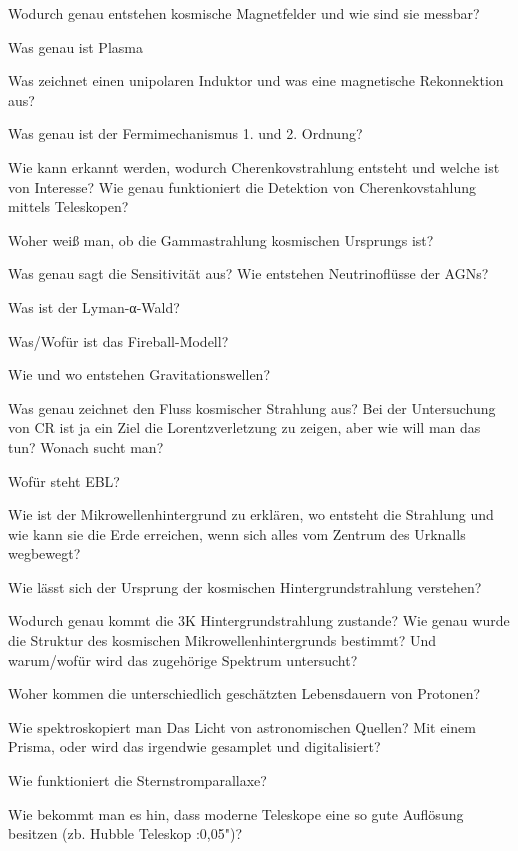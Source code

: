 \begin{frame}
  Wodurch genau entstehen kosmische Magnetfelder und wie sind sie messbar?

  Was genau ist Plasma

  Was zeichnet einen unipolaren Induktor und was eine magnetische Rekonnektion aus?

  Was genau ist der Fermimechanismus 1. und 2. Ordnung?

  Wie kann erkannt werden, wodurch Cherenkovstrahlung entsteht und welche ist von Interesse?
  Wie genau funktioniert die Detektion von Cherenkovstahlung mittels Teleskopen?

  Woher weiß man, ob die Gammastrahlung kosmischen Ursprungs ist?

  Was genau sagt die Sensitivität aus?
  Wie entstehen Neutrinoflüsse der AGNs?

  Was ist der Lyman-α-Wald?

  Was/Wofür ist das Fireball-Modell?

  Wie und wo entstehen Gravitationswellen?

  Was genau zeichnet den Fluss kosmischer Strahlung aus?
  Bei der Untersuchung von CR ist ja ein Ziel die Lorentzverletzung zu
  zeigen, aber wie will man das tun? Wonach sucht man?

  Wofür steht EBL?

  Wie ist der Mikrowellenhintergrund zu erklären, wo entsteht die Strahlung
  und wie kann sie die Erde erreichen, wenn sich alles vom Zentrum des Urknalls
  wegbewegt?

    Wie lässt sich der Ursprung der kosmischen Hintergrundstrahlung verstehen?

    Wodurch genau kommt die 3K Hintergrundstrahlung zustande? Wie genau wurde die Struktur des kosmischen Mikrowellenhintergrunds bestimmt?
    Und warum/wofür wird das zugehörige Spektrum untersucht?

  Woher kommen die unterschiedlich geschätzten Lebensdauern von Protonen?

  Wie spektroskopiert man Das Licht von astronomischen Quellen? Mit einem Prisma, oder wird das irgendwie gesamplet und digitalisiert?

  Wie funktioniert die Sternstromparallaxe?

  Wie bekommt man es hin, dass moderne Teleskope eine so gute Auflösung
  besitzen (zb. Hubble Teleskop :0,05")?

\end{frame}
